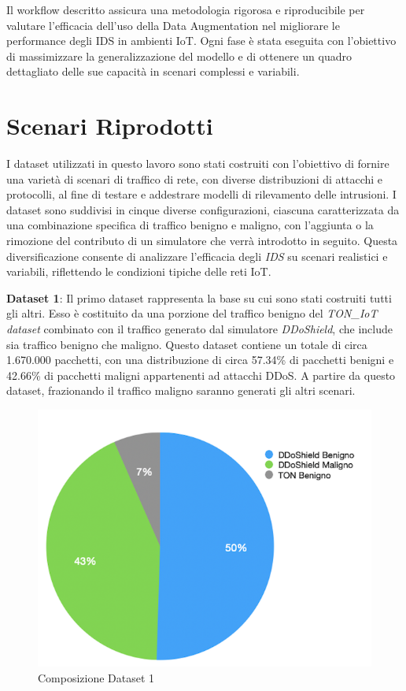 Il workflow descritto assicura una metodologia rigorosa e riproducibile per valutare l'efficacia dell'uso della Data Augmentation nel migliorare le performance degli IDS in ambienti IoT. Ogni fase è stata eseguita con l'obiettivo di massimizzare la generalizzazione del modello e di ottenere un quadro dettagliato delle sue capacità in scenari complessi e variabili.

\section{Scenari Riprodotti}
I dataset utilizzati in questo lavoro sono stati costruiti con l'obiettivo di fornire una varietà di scenari di traffico di rete, con diverse distribuzioni di attacchi e protocolli, al fine di testare e addestrare modelli di rilevamento delle intrusioni. I dataset sono suddivisi in cinque diverse configurazioni, ciascuna caratterizzata da una combinazione specifica di traffico benigno e maligno, con l'aggiunta o la rimozione del contributo di un simulatore che verrà introdotto in seguito. Questa diversificazione consente di analizzare l'efficacia degli \textit{IDS} su scenari realistici e variabili, riflettendo le condizioni tipiche delle reti IoT.

\textbf{Dataset 1}: Il primo dataset rappresenta la base su cui sono stati costruiti tutti gli altri. Esso è costituito da una porzione del traffico benigno del \textit{TON\_IoT dataset} combinato con il traffico generato dal simulatore \textit{DDoShield}, che include sia traffico benigno che maligno. Questo dataset contiene un totale di circa 1.670.000 pacchetti, con una distribuzione di circa 57.34\% di pacchetti benigni e 42.66\% di pacchetti maligni appartenenti ad attacchi DDoS. A partire da questo dataset, frazionando il traffico maligno saranno generati gli altri scenari.

\begin{figure}[htbp]
\centering
\includegraphics[scale= 0.8]{UNINA_MSc_Thesis_Project/img/chapterRisulati/composizione_DATASET_1 centrata.png}
  \caption{Composizione Dataset 1}
\end{figure}


